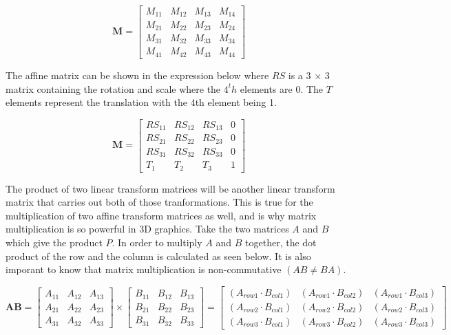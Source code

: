 \begin{equation}
\textbf{M} = \begin{bmatrix}
M_{11} & M_{12} & M_{13} & M_{14}\\
M_{21} & M_{22} & M_{23} & M_{24}\\
M_{31} & M_{32} & M_{33} & M_{34}\\
M_{41} & M_{42} & M_{43} & M_{44}
\end{bmatrix}
\end{equation}

\noindent
The affine matrix can be shown in the expression below where $RS$ is a 3 $\times$ 3 matrix containing the rotation and scale where the $4^th$ elements are 0. The $T$ elements represent the translation with the 4th element being 1. 

\begin{equation}
\textbf{M} = \begin{bmatrix}
RS_{11} & RS_{12} & RS_{13} & 0\\
RS_{21} & RS_{22} & RS_{23} & 0\\
RS_{31} & RS_{32} & RS_{33} & 0\\
T_{1} & T_{2} & T_{3} & 1
\end{bmatrix}
\end{equation}

The product of two linear transform matrices will be another linear transform matrix that carries out both of those tranformations. This is true for the multiplication of two affine transform matrices as well, and is why matrix multiplication is so powerful in 3D graphics. Take the two matrices $A$ and $B$ which give the product $P$. In order to multiply $A$ and $B$ together, the dot product of the row and the column is calculated as seen below. It is also imporant to know that matrix multiplication is non-commutative $(AB \not= BA)$.

\begin{equation}
\textbf{AB} = \begin{bmatrix}
A_{11} & A_{12} & A_{13}\\
A_{21} & A_{22} & A_{23}\\
A_{31} & A_{32} & A_{33}
\end{bmatrix}
\times
\begin{bmatrix}
B_{11} & B_{12} & B_{13}\\
B_{21} & B_{22} & B_{23}\\
B_{31} & B_{32} & B_{33}
\end{bmatrix}
= \begin{bmatrix}
(A_{row1} \cdot B_{col1}) & (A_{row1} \cdot B_{col2}) & (A_{row1} \cdot B_{col3})\\
(A_{row2} \cdot B_{col1}) & (A_{row2} \cdot B_{col2}) & (A_{row2} \cdot B_{col3})\\
(A_{row3} \cdot B_{col1}) & (A_{row3} \cdot B_{col2}) & (A_{row3} \cdot B_{col3})
\end{bmatrix}
\end{equation}

